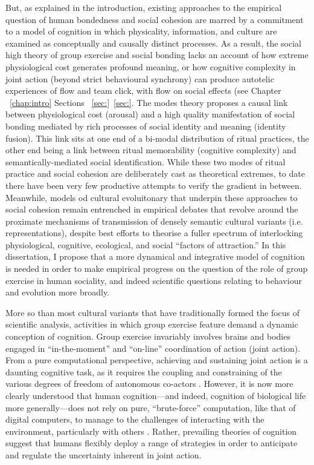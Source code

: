 \begin{CJK}{UTF8}{gbsn}
But, as explained in the introduction, existing approaches to the empirical question of human bondedness and social cohesion are marred by a commitment to a model of cognition in which physicality, information, and culture are examined as conceptually and causally distinct processes.  As a result, the social high theory of group exercise and social bonding \citep[cf.][]{Cohen2017} lacks an account of how extreme physiological cost generates profound meaning, or how cognitive complexity in joint action (beyond strict behavioural synchrony) can produce autotelic experiences of flow and team click, with flow on social effects (see Chapter ~\ref{chap:intro} Sections ~\ref{sec:}\nobreakdash~\ref{sec:}.  The modes theory \citep[cf.][]{Whitehouse2004} proposes a causal link between physiological cost (arousal) and a high quality manifestation of social bonding mediated by rich processes of social identity and meaning (identity fusion). This link sits at one end of a bi-modal distribution of ritual practices, the other end being a link between ritual memorability (cognitive complexity) and semantically-mediated social identification.  While these two modes of ritual practice and social cohesion are deliberately cast as theoretical extremes, to date there have been very few productive attempts to verify the gradient in between.  Meanwhile, models od cultural evoluitonary that underpin these approaches to social cohesion remain entrenched in empirical debates that revolve around the proximate mechanisms of transmission of densely semantic cultural variants (i.e. representations), despite best efforts to theorise a fuller spectrum of interlocking physiological, cognitive, ecological, and social ``factors of attraction.''  In this dissertation, I propose that a more dynamical and integrative model of cognition is needed in order to make empirical progress on the question of the role of group exercise in human sociality, and indeed scientific questions relating to behaviour and evolution more broadly.

More so than most cultural variants that have traditionally formed the focus of scientific analysis, activities in which group exercise feature demand a dynamic conception of cognition.  Group exercise invariably involves brains and bodies engaged in “in-the-moment” and “on-line” coordination of action (joint action).  From a pure computational perspective, achieving and sustaining joint action is a daunting cognitive task, as it requires the coupling and constraining of the various degrees of freedom of autonomous co-actors \citep{Bernstein1967}.  However, it is now more clearly understood that human cognition—and indeed, cognition of biological life more generally—does not rely on pure, “brute-force” computation, like that of digital computers, to manage to the challenges of interacting with the environment, particularly with others \citep{Yufik2013}.  Rather, prevailing theories of cognition suggest that humans flexibly deploy a range of strategies in order to anticipate and regulate the uncertainty inherent in joint action.


\end{CJK}
